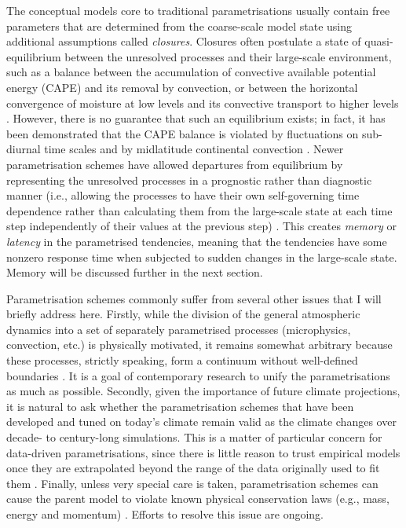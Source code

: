 \documentclass[titlepage,twoside]{article}
\numberwithin{equation}{section}
\begin{document}
The conceptual models core to traditional parametrisations usually contain free
parameters that are determined from the coarse-scale model state using
additional assumptions called \emph{closures}. Closures often postulate a state
of quasi-equilibrium between the unresolved processes and their large-scale
environment, such as a balance between the accumulation of convective available
potential energy (CAPE) and its removal by convection, or between the
horizontal convergence of moisture at low levels and its convective transport
to higher levels \parencite{mcfarlane2011,christensen2022,palmer2019}. However,
there is no guarantee that such an equilibrium exists; in fact, it has been
demonstrated that the CAPE balance is violated by fluctuations on sub-diurnal
time scales \parencite{donner2003} and by midlatitude continental convection
\parencite{zhang2002}. Newer parametrisation schemes have allowed departures
from equilibrium by representing the unresolved processes in a prognostic
rather than diagnostic manner (i.e., allowing the processes to have their own
self-governing time dependence rather than calculating them from the
large-scale state at each time step independently of their values at the
previous step) \parencite{rio2019,berner2017}. This creates \emph{memory} or
\emph{latency} in the parametrised tendencies, meaning that the tendencies have
some nonzero response time when subjected to sudden changes in the large-scale
state. Memory will be discussed further in the next section.

Parametrisation schemes commonly suffer from several other issues that I will
briefly address here.
Firstly, while the division of the general atmospheric dynamics into a set of
separately parametrised processes (microphysics, convection, etc.) is
physically motivated, it remains somewhat arbitrary because these processes,
strictly speaking, form a continuum without well-defined boundaries
\parencite{christensen2022,mcfarlane2011}. It is a goal of contemporary
research to unify the parametrisations as much as possible.
Secondly, given the importance of future climate projections, it is natural to
ask whether the parametrisation schemes that have been developed and tuned on
today's climate remain valid as the climate changes over decade- to
century-long simulations. This is a matter of particular concern for
data-driven parametrisations, since there is little reason to trust empirical
models once they are extrapolated beyond the range of the data originally used
to fit them \parencite{christensen2022}.
Finally, unless very special care is taken, parametrisation schemes can cause
the parent model to violate known physical conservation laws (e.g., mass,
energy and momentum) \parencite{christensen2022}. Efforts to resolve this issue
are ongoing.
\end{document}
